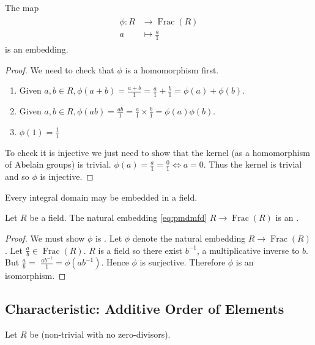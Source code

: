 \documentclass{article}
\newcommand{\Frac}{\operatorname{Frac}}
\begin{document}
\begin{thma}
The map
\begin{align}
\begin{aligned}
\phi: R & \rightarrow \operatorname{Frac}(R) \\\label{eq:pmdmfd}
a & \mapsto \frac{a}{1}
\end{aligned}
\end{align}
is an embedding.
\end{thma}
\begin{proof}
 We need to check that $\phi$ is a homomorphism first.
 \begin{enumerate}
     \item Given $a, b \in R, \phi(a+b)=\frac{a+b}{1}=\frac{a}{1}+\frac{b}{1}=\phi(a)+\phi(b)$.
     \item Given $a, b \in R, \phi(a b)=\frac{a b}{1}=\frac{a}{1} \times \frac{b}{1}=\phi(a) \phi(b)$.
     \item  $\phi(1)=\frac{1}{1}$
 \end{enumerate}
To check it is injective we just need to show that the kernel (as a homomorphism of Abelain groups) is trivial.
$\phi(a)=\frac{a}{1}=\frac{0}{1} \Longleftrightarrow a=0$. Thus the kernel is trivial and so $\phi$ is injective.
\end{proof}
\begin{cora}
Every integral domain may be embedded in a field.
\end{cora} 
\begin{cora}
Let $R$ be a field. The natural embedding \cref{eq:pmdmfd} $R \rightarrow \Frac(R)$ is an .
\end{cora}
\begin{proof}
 We must show $\phi$ is . Let $\phi$ denote the natural embedding $R \rightarrow \Frac(R)$. Let $\frac{a}{b} \in \operatorname{Frac}(R)$. $R$ is a field so there exist $b^{-1}$, a multiplicative inverse to $b$. But $\frac{a}{b}=$ $\frac{a b^{-1}}{1}=\phi\left(a b^{-1}\right)$. Hence $\phi$ is surjective. Therefore $\phi$ is an isomorphism.
\end{proof}

\subsection{Characteristic: Additive Order of Elements}
Let $R$ be  (non-trivial with no zero-divisors). 
\end{document}
